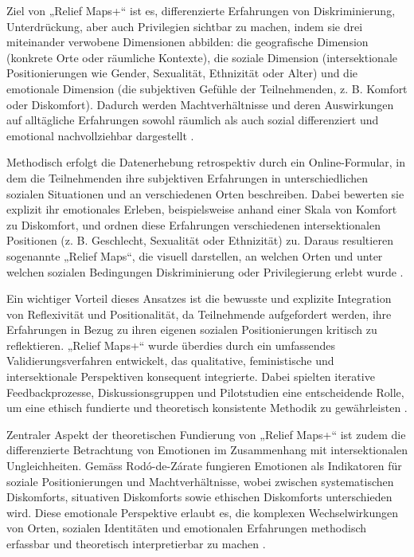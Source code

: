 Ziel von „Relief Maps+“ ist es, differenzierte Erfahrungen von Diskriminierung, Unterdrückung, aber auch Privilegien sichtbar zu machen, indem sie drei miteinander verwobene Dimensionen abbilden: die geografische Dimension (konkrete Orte oder räumliche Kontexte), die soziale Dimension (intersektionale Positionierungen wie Gender, Sexualität, Ethnizität oder Alter) und die emotionale Dimension (die subjektiven Gefühle der Teilnehmenden, z. B. Komfort oder Diskomfort). Dadurch werden Machtverhältnisse und deren Auswirkungen auf alltägliche Erfahrungen sowohl räumlich als auch sozial differenziert und emotional nachvollziehbar dargestellt \parencite{rodo-de-zarateIntersectionalitySpatialityEmotions2023}.

Methodisch erfolgt die Datenerhebung retrospektiv durch ein Online-Formular, in dem die Teilnehmenden ihre subjektiven Erfahrungen in unterschiedlichen sozialen Situationen und an verschiedenen Orten beschreiben. Dabei bewerten sie explizit ihr emotionales Erleben, beispielsweise anhand einer Skala von Komfort zu Diskomfort, und ordnen diese Erfahrungen verschiedenen intersektionalen Positionen (z. B. Geschlecht, Sexualität oder Ethnizität) zu. Daraus resultieren sogenannte „Relief Maps“, die visuell darstellen, an welchen Orten und unter welchen sozialen Bedingungen Diskriminierung oder Privilegierung erlebt wurde \parencite{luizdesouzaSpiralValidationProcess2025, rodo-de-zarateIntersectionalitySpatialityEmotions2023}.

Ein wichtiger Vorteil dieses Ansatzes ist die bewusste und explizite Integration von Reflexivität und Positionalität, da Teilnehmende aufgefordert werden, ihre Erfahrungen in Bezug zu ihren eigenen sozialen Positionierungen kritisch zu reflektieren. „Relief Maps+“ wurde überdies durch ein umfassendes Validierungsverfahren entwickelt, das qualitative, feministische und intersektionale Perspektiven konsequent integrierte. Dabei spielten iterative Feedbackprozesse, Diskussionsgruppen und Pilotstudien eine entscheidende Rolle, um eine ethisch fundierte und theoretisch konsistente Methodik zu gewährleisten \parencite{luizdesouzaSpiralValidationProcess2025}.

Zentraler Aspekt der theoretischen Fundierung von „Relief Maps+“ ist zudem die differenzierte Betrachtung von Emotionen im Zusammenhang mit intersektionalen Ungleichheiten. Gemäss Rodó-de-Zárate fungieren Emotionen als Indikatoren für soziale Positionierungen und Machtverhältnisse, wobei zwischen systematischen Diskomforts, situativen Diskomforts sowie ethischen Diskomforts unterschieden wird. Diese emotionale Perspektive erlaubt es, die komplexen Wechselwirkungen von Orten, sozialen Identitäten und emotionalen Erfahrungen methodisch erfassbar und theoretisch interpretierbar zu machen \parencite{rodo-de-zarateIntersectionalitySpatialityEmotions2023}.


